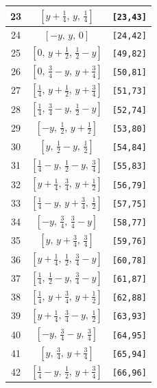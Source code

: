 \documentclass[fleqn,8pt]{jsarticle}
\begin{document}
\begin{longtable}{ccc}
23 & $\left[ y + \frac{1}{4},\, y,\, \frac{1}{4} \right]$ & {\tt [23,43]} \\ \hline
24 & $\left[ - y,\, y,\, 0 \right]$ & {\tt [24,42]} \\ \hline
25 & $\left[ 0,\, y + \frac{1}{2},\, \frac{1}{2} - y \right]$ & {\tt [49,82]} \\ \hline
26 & $\left[ 0,\, \frac{3}{4} - y,\, y + \frac{3}{4} \right]$ & {\tt [50,81]} \\ \hline
27 & $\left[ \frac{1}{4},\, y + \frac{1}{2},\, y + \frac{3}{4} \right]$ & {\tt [51,73]} \\ \hline
28 & $\left[ \frac{1}{4},\, \frac{3}{4} - y,\, \frac{1}{2} - y \right]$ & {\tt [52,74]} \\ \hline
29 & $\left[ - y,\, \frac{1}{2},\, y + \frac{1}{2} \right]$ & {\tt [53,80]} \\ \hline
30 & $\left[ y,\, \frac{1}{2} - y,\, \frac{1}{2} \right]$ & {\tt [54,84]} \\ \hline
31 & $\left[ \frac{1}{4} - y,\, \frac{1}{2} - y,\, \frac{3}{4} \right]$ & {\tt [55,83]} \\ \hline
32 & $\left[ y + \frac{1}{4},\, \frac{3}{4},\, y + \frac{1}{2} \right]$ & {\tt [56,79]} \\ \hline
33 & $\left[ \frac{1}{4} - y,\, y + \frac{3}{4},\, \frac{1}{2} \right]$ & {\tt [57,75]} \\ \hline
34 & $\left[ - y,\, \frac{3}{4},\, \frac{3}{4} - y \right]$ & {\tt [58,77]} \\ \hline
35 & $\left[ y,\, y + \frac{3}{4},\, \frac{3}{4} \right]$ & {\tt [59,76]} \\ \hline
36 & $\left[ y + \frac{1}{4},\, \frac{1}{2},\, \frac{3}{4} - y \right]$ & {\tt [60,78]} \\ \hline
37 & $\left[ \frac{1}{4},\, \frac{1}{2} - y,\, \frac{3}{4} - y \right]$ & {\tt [61,87]} \\ \hline
38 & $\left[ \frac{1}{4},\, y + \frac{3}{4},\, y + \frac{1}{2} \right]$ & {\tt [62,88]} \\ \hline
39 & $\left[ y + \frac{1}{4},\, \frac{3}{4} - y,\, \frac{1}{2} \right]$ & {\tt [63,93]} \\ \hline
40 & $\left[ - y,\, \frac{3}{4} - y,\, \frac{3}{4} \right]$ & {\tt [64,95]} \\ \hline
41 & $\left[ y,\, \frac{3}{4},\, y + \frac{3}{4} \right]$ & {\tt [65,94]} \\ \hline
42 & $\left[ \frac{1}{4} - y,\, \frac{1}{2},\, y + \frac{3}{4} \right]$ & {\tt [66,96]} \\ \hline

\end{longtable}
\end{document}
